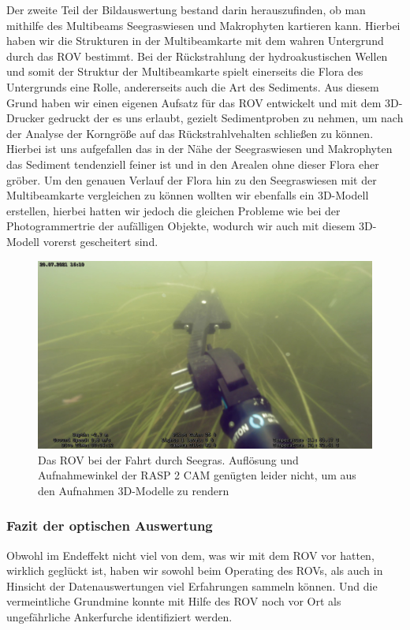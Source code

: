 Der zweite Teil der Bildauswertung bestand darin herauszufinden, ob man mithilfe des Multibeams Seegraswiesen und Makrophyten kartieren kann. Hierbei haben wir die Strukturen in der Multibeamkarte mit dem wahren Untergrund durch das ROV bestimmt.
Bei der Rückstrahlung der hydroakustischen Wellen und somit der Struktur der Multibeamkarte spielt einerseits die Flora des Untergrunds eine Rolle, andererseits auch die Art des Sediments.
Aus diesem Grund haben wir einen eigenen Aufsatz für das ROV entwickelt und mit dem 3D-Drucker gedruckt der es uns erlaubt, gezielt Sedimentproben zu nehmen, um nach der Analyse der Korngröße auf das Rückstrahlvehalten schließen zu können.
Hierbei ist uns aufgefallen das in der Nähe der Seegraswiesen und Makrophyten das Sediment tendenziell feiner ist und in den Arealen ohne dieser Flora eher gröber.
Um den genauen Verlauf der Flora hin zu den Seegraswiesen mit der Multibeamkarte vergleichen zu können wollten wir ebenfalls ein 3D-Modell erstellen, hierbei hatten wir jedoch die gleichen Probleme wie bei der Photogrammertrie der aufälligen Objekte, wodurch wir auch mit diesem 3D-Modell vorerst gescheitert sind.
\begin{figure}[htb]
\includegraphics[height=\textheight,%
                   width=\textwidth,%
                   keepaspectratio]{Bilder/ROV/Seegras.png}
\caption{Das ROV bei der Fahrt durch Seegras. Auflösung und Aufnahmewinkel der RASP 2 CAM genügten leider nicht, um aus den Aufnahmen 3D-Modelle zu rendern}
\end{figure}


\subsubsection{Fazit der optischen Auswertung}
Obwohl im Endeffekt nicht viel von dem, was wir mit dem ROV vor hatten, wirklich geglückt ist, haben wir sowohl beim Operating des ROVs, als auch in Hinsicht der Datenauswertungen viel Erfahrungen sammeln können. Und die vermeintliche Grundmine konnte mit Hilfe des ROV noch vor Ort als ungefährliche Ankerfurche identifiziert werden.




